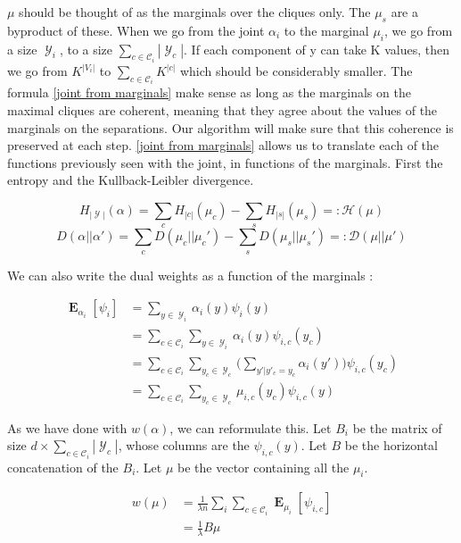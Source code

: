 \documentclass{article}
\DeclareMathOperator{\1}{\mathbb{1}}
\DeclareMathOperator{\E}{\mathbf{E}}
\DeclareMathOperator{\Y}{\mathcal{Y}}
\begin{document}
$\mu$ should be thought of as the marginals over the cliques only.
The $\mu_s$ are a byproduct of these.
When we go from the joint $\alpha_i$ to the marginal $\mu_i$, we go from a size $\Y_i$, to a size $\sum_{c \in \mathcal C_i} |\Y_c|$.
If each component of y can take K values, then we go from $K^{|V_i|}$ to $\sum_{c \in \mathcal C_i} K^{|c|}$ which should be considerably smaller.
The formula \ref{joint from marginals} make sense as long as the marginals on the maximal cliques are coherent, meaning that they agree about the values of the marginals on the separations.
Our algorithm will make sure that this coherence is preserved at each step.
\ref{joint from marginals} allows us to translate each of the functions previously seen with the joint, in functions of the marginals.
First the entropy and the Kullback-Leibler divergence.

\begin{equation}
	H_{|\Y|} (\alpha) = \sum_c H_{|c|}(\mu_c) - \sum_s H_{|s|}(\mu_s) =: \mathcal H (\mu) 
	\label{marginals entropy}
\end{equation}
\begin{equation}
	D(\alpha||\alpha') = \sum_c D(\mu_c||\mu_c') - \sum_s D(\mu_s||\mu_s') =: \mathcal D (\mu||\mu')
\end{equation}

We can also write the dual weights as a function of the marginals :

\begin{align*}
	   \E_{\alpha_i}[\psi_i]
   & = \sum_{y \in \Y_i} \alpha_i(y) \psi_i(y)  \\
   &  = \sum_{c \in \mathcal C_i} \sum_{y \in \Y_i}  \alpha_i(y)  \psi_{i, c}(y_c)  \\
   & = \sum_{c \in \mathcal C_i}\sum_{y_c \in  \Y_c} \bigg ( \sum_{y'| y'_c = y_c } \alpha_i(y') \bigg ) \psi_{i, c}(y_c) \\
   & = \sum_{c \in \mathcal C_i}\sum_{y_c \in \Y_c} \mu_{i, c}(y_c)  \psi_{i, c}(y)
\end{align*}

As we have done with $w(\alpha)$, we can reformulate this.
Let  $B_i$ be the matrix of size $d \times  \sum_{c \in \mathcal C_i} |\Y_c|$, whose columns are the $\psi_{i, c}(y)$.
Let $B$ be the horizontal concatenation of the $B_i$.
Let $\mu$ be the vector containing all the $\mu_i$.

\begin{align}
	w (\mu)
	& =\frac{1}{\lambda n} \sum_i \sum_{c \in \mathcal C_i} \E_{\mu_i}[\psi_{i, c}] \\
	& = \frac{1}{\lambda} B\mu \label{marginals to primal}
\end{align}
\end{document}
